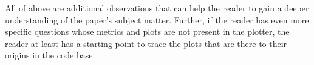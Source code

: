 All of above are additional observations that can help the reader to gain a deeper understanding of the paper's subject matter. Further, if the reader has even more specific questions whose metrics and plots are not present in the plotter, the reader at least has a starting point to trace the plots that are there to their origins in the code base.

